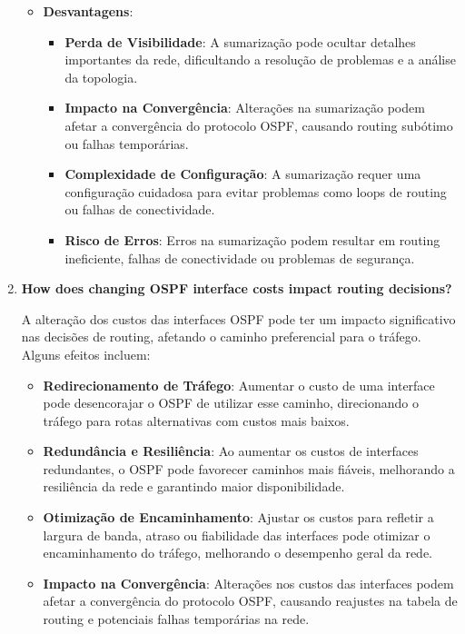 \documentclass[11pt,english, openright, oneside]{book}
\begin{document}
\begin{enumerate}
\begin{itemize}
    \newpage
    \item \textbf{Desvantagens}:
    \begin{itemize}
      \item \textbf{Perda de Visibilidade}: A sumarização pode ocultar detalhes importantes da rede, dificultando a resolução de problemas e a análise da topologia.
      \item \textbf{Impacto na Convergência}: Alterações na sumarização podem afetar a convergência do protocolo OSPF, causando routing subótimo ou falhas temporárias.
      \item \textbf{Complexidade de Configuração}: A sumarização requer uma configuração cuidadosa para evitar problemas como loops de routing ou falhas de conectividade.
      \item \textbf{Risco de Erros}: Erros na sumarização podem resultar em routing ineficiente, falhas de conectividade ou problemas de segurança.
    \end{itemize}
  \end{itemize}


  \item \textbf{How does changing OSPF interface costs impact routing decisions?}
  \vspace{0.2cm}

  A alteração dos custos das interfaces OSPF pode ter um impacto significativo nas decisões de routing, afetando o caminho preferencial para o tráfego. Alguns efeitos incluem:
  \vspace{0.2cm}

  \begin{itemize}
    \item \textbf{Redirecionamento de Tráfego}: Aumentar o custo de uma interface pode desencorajar o OSPF de utilizar esse caminho, direcionando o tráfego para rotas alternativas com custos mais baixos.
    \item \textbf{Redundância e Resiliência}: Ao aumentar os custos de interfaces redundantes, o OSPF pode favorecer caminhos mais fiáveis, melhorando a resiliência da rede e garantindo maior disponibilidade.
    \item \textbf{Otimização de Encaminhamento}: Ajustar os custos para refletir a largura de banda, atraso ou fiabilidade das interfaces pode otimizar o encaminhamento do tráfego, melhorando o desempenho geral da rede.
    \item \textbf{Impacto na Convergência}: Alterações nos custos das interfaces podem afetar a convergência do protocolo OSPF, causando reajustes na tabela de routing e potenciais falhas temporárias na rede.
  \end{itemize}
  \vspace{0.2cm}


\end{enumerate}
\end{document}
